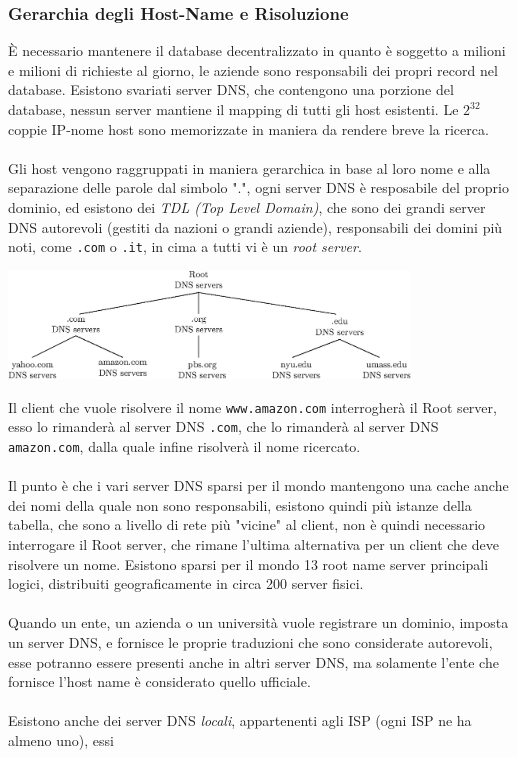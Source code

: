 \documentclass[12pt, letterpaper]{article}
\newcommand{\code}[1]{\colorbox{light-gray}{\texttt{#1}}}
\newcommand{\acc}{\\\hphantom{}\\}
\begin{document}
\subsubsection{Gerarchia degli Host-Name e Risoluzione}
È necessario mantenere il database decentralizzato in quanto è soggetto a milioni e milioni di richieste 
al giorno, le aziende sono responsabili dei propri record nel database. Esistono svariati server DNS, che contengono una
porzione del database, nessun server mantiene il mapping di tutti gli host esistenti. Le $2^{32}$ coppie
IP-nome host sono memorizzate in maniera da rendere breve la ricerca. \acc
Gli host vengono raggruppati in maniera gerarchica in base al loro nome e alla separazione delle parole
dal simbolo ".", ogni server DNS è resposabile del proprio dominio, ed esistono dei \textit{TDL (Top Level Domain)},
che sono dei grandi server DNS autorevoli (gestiti da nazioni o grandi aziende), responsabili dei domini più noti, come \code{.com} o \code{.it}, in
cima a tutti vi è un \textit{root server}.\begin{center}
    \includegraphics[width=0.8\textwidth ]{images/DNS.eps}
\end{center}
Il client che vuole risolvere il nome \code{www.amazon.com} interrogherà il Root server, esso
lo rimanderà al server DNS \code{.com}, che lo rimanderà al server DNS \code{amazon.com}, dalla quale infine
risolverà il nome ricercato.\acc
Il punto è che i vari server DNS sparsi per il mondo mantengono una cache anche dei nomi della quale non sono
responsabili, esistono quindi più istanze della tabella, che sono a livello di rete più "vicine" al client, non è
quindi necessario interrogare il Root server, che rimane l'ultima alternativa per un client che deve
risolvere un nome. Esistono sparsi per il mondo 13 root name server principali logici, distribuiti
geograficamente in circa 200 server fisici.\acc
Quando un ente, un azienda o un università vuole registrare un dominio, imposta un server DNS, e fornisce
le proprie traduzioni che sono considerate autorevoli, esse potranno essere presenti anche in altri server
DNS, ma solamente l'ente che fornisce l'host name è considerato quello ufficiale.\acc
Esistono anche dei server DNS \textit{locali}, appartenenti agli ISP (ogni ISP ne ha almeno uno), essi
\end{document}
